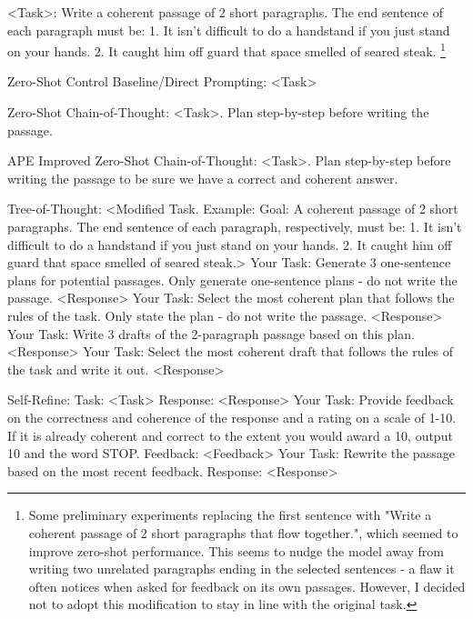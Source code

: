 \documentclass[11pt]{article}
\begin{document}
<Task>:
Write a coherent passage of 2 short paragraphs. The end sentence of each paragraph must be: 1. It isn't difficult to do a handstand if you just stand on your hands. 2. It caught him off guard that space smelled of seared steak. \footnote{Some preliminary experiments replacing the first sentence with "Write a coherent passage of 2 short paragraphs that flow together.", which seemed to improve zero-shot performance. This seems to nudge the model away from writing two unrelated paragraphs ending in the selected sentences - a flaw it often notices when asked for feedback on its own passages. However, I decided not to adopt this modification to stay in line with the original task.}

Zero-Shot Control Baseline/Direct Prompting:
<Task>

Zero-Shot Chain-of-Thought:
<Task>. Plan step-by-step before writing the passage.

APE Improved Zero-Shot Chain-of-Thought:
<Task>. Plan step-by-step before writing the passage to be sure we have a correct and coherent answer.

Tree-of-Thought:
<Modified Task. Example: Goal: A coherent passage of 2 short paragraphs. The end sentence of each paragraph, respectively, must be: 1. It isn't difficult to do a handstand if you just stand on your hands. 2. It caught him off guard that space smelled of seared steak.>
Your Task: Generate 3 one-sentence plans for potential passages. Only generate one-sentence plans - do not write the passage.
<Response>
Your Task: Select the most coherent plan that follows the rules of the task. Only state the plan - do not write the passage.
<Response>
Your Task: Write 3 drafts of the 2-paragraph passage based on this plan.
<Response>
Your Task: Select the most coherent draft that follows the rules of the task and write it out.
<Response>

Self-Refine: 
Task: <Task>
Response: <Response>
Your Task: Provide feedback on the correctness and coherence of the response and a rating on a scale of 1-10. If it is already coherent and correct to the extent you would award a 10, output 10 and the word STOP.
Feedback: <Feedback>
Your Task: Rewrite the passage based on the most recent feedback.
Response: <Response>
\end{document}
